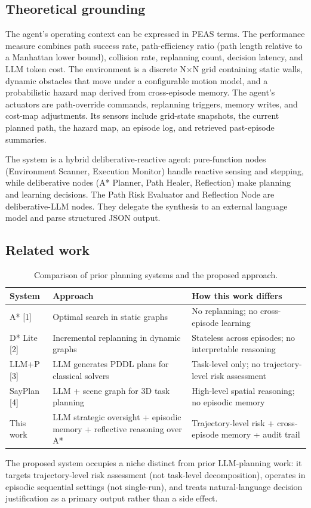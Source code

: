 \documentclass[11pt, letterpaper]{article}
\begin{document}
\subsection{Theoretical grounding}
The agent's operating context can be expressed in PEAS terms. The performance measure combines path success rate, path-efficiency ratio (path length relative to a Manhattan lower bound), collision rate, replanning count, decision latency, and LLM token cost. The environment is a discrete N×N grid containing static walls, dynamic obstacles that move under a configurable motion model, and a probabilistic hazard map derived from cross-episode memory. The agent's actuators are path-override commands, replanning triggers, memory writes, and cost-map adjustments. Its sensors include grid-state snapshots, the current planned path, the hazard map, an episode log, and retrieved past-episode summaries.

The system is a hybrid deliberative-reactive agent: pure-function nodes (Environment Scanner, Execution Monitor) handle reactive sensing and stepping, while deliberative nodes (A* Planner, Path Healer, Reflection) make planning and learning decisions. The Path Risk Evaluator and Reflection Node are deliberative-LLM nodes. They delegate the synthesis to an external language model and parse structured JSON output.

\subsection{Related work}
\begin{table}[H]
    \centering
    \small
    \caption{Comparison of prior planning systems and the proposed approach.}
    \begin{tabular}{p{} p{} p{}}
        \toprule
        \textbf{System} & \textbf{Approach} & \textbf{How this work differs} \\
        \midrule
        A* [1] & Optimal search in static graphs & No replanning; no cross-episode learning \\
        D* Lite [2] & Incremental replanning in dynamic graphs & Stateless across episodes; no interpretable reasoning \\
        LLM+P [3] & LLM generates PDDL plans for classical solvers & Task-level only; no trajectory-level risk assessment \\
        SayPlan [4] & LLM + scene graph for 3D task planning & High-level spatial reasoning; no episodic memory \\
        This work & LLM strategic oversight + episodic memory + reflective reasoning over A* & Trajectory-level risk + cross-episode memory + audit trail \\
        \bottomrule
    \end{tabular}
\end{table}
The proposed system occupies a niche distinct from prior LLM-planning work: it targets trajectory-level risk assessment (not task-level decomposition), operates in episodic sequential settings (not single-run), and treats natural-language decision justification as a primary output rather than a side effect.
\end{document}
